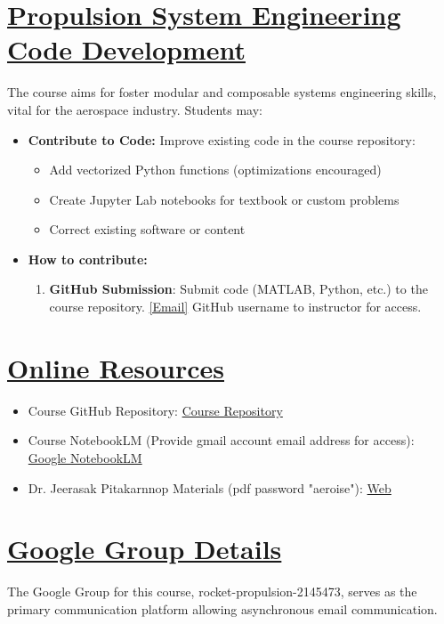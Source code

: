 \documentclass[12pt]{article}
\begin{document}
\section{\hyperref[sec:software_development]{Propulsion System Engineering Code Development}}
\label{sec:software_development}
The course aims for foster modular and composable systems engineering skills, vital for the aerospace industry. Students may:
\begin{itemize}
    \item \textbf{Contribute to Code:} Improve existing code in the course repository:
          \begin{itemize}
              \item Add vectorized Python functions (optimizations encouraged)
              \item Create Jupyter Lab notebooks for textbook or custom problems
              \item Correct existing software or content
          \end{itemize}
    \item \textbf{How to contribute:}
          \begin{enumerate}
              \item \textbf{GitHub Submission}: Submit code (MATLAB, Python, etc.) to the course repository. \href{mailto:vkhansen@eng.chula.ac.th}{[Email]} GitHub username to instructor for access.
          \end{enumerate}
\end{itemize}

\section{\hyperref[sec:resources]{Online Resources}}
\label{sec:resources}
\begin{itemize}
    \item Course GitHub Repository: \href{https://github.com/vkhansen/rocket_propulsion.git}{Course Repository}
    \item Course NotebookLM (Provide gmail account email address for access): \href{https://notebooklm.google.com/notebook/c7f10837-5c21-46ee-af09-273d38bb41a3}{Google NotebookLM}
    \item Dr. Jeerasak Pitakarnnop Materials (pdf password "aeroise"): \href{https://pitakarnnop.wordpress.com/engineering-courses/rocket-propulsion}{Web}
\end{itemize}

\section{\hyperref[sec:google_group]{Google Group Details}}
\label{sec:google_group}
The Google Group for this course, rocket-propulsion-2145473, serves as the primary communication platform allowing asynchronous email communication.
\end{document}
